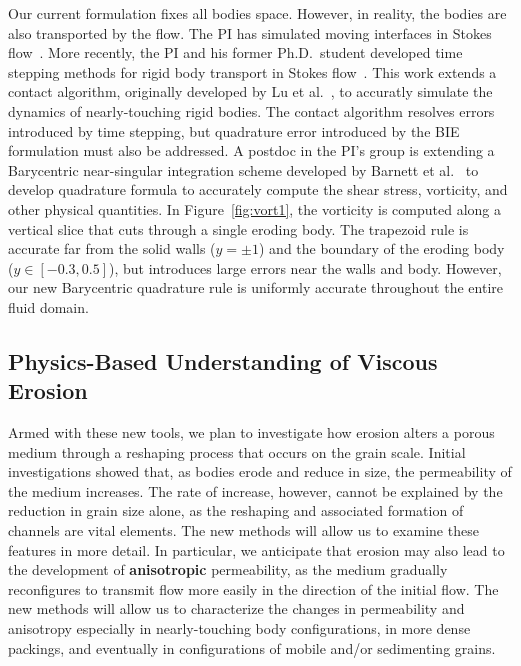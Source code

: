 \documentclass[11pt]{article}
\begin{document}
Our current formulation fixes all bodies space.  However, in reality,
the bodies are also transported by the flow.  The PI has simulated
moving interfaces in Stokes flow~\cite{qua-bir2015b, qua-bir2014,
qua-bir2016}. More recently, the PI and his former Ph.D.~student
developed time stepping methods for rigid body transport in Stokes
flow~\cite{bys-sha-qua2018}.  This work extends a contact algorithm,
originally developed by Lu et al.~\cite{lu-rah-zor2017}, to accuratly
simulate the dynamics of nearly-touching rigid bodies.  The contact
algorithm resolves errors introduced by time stepping, but quadrature
error introduced by the BIE formulation must also be addressed.  A
postdoc in the PI's group is extending a Barycentric near-singular
integration scheme developed by Barnett et al.~\cite{bar-wu-vee2015} to
develop quadrature formula to accurately compute the shear stress,
vorticity, and other physical quantities.  In Figure~\ref{fig:vort1},
the vorticity is computed along a vertical slice that cuts through a
single eroding body.  The trapezoid rule is accurate far from the solid
walls ($y = \pm 1$) and the boundary of the eroding body ($y \in
[-0.3,0.5]$), but introduces large errors near the walls and body.
However, our new Barycentric quadrature rule is uniformly accurate
throughout the entire fluid domain.


\subsection{Physics-Based Understanding of Viscous Erosion}

Armed with these new tools, we plan to investigate how erosion alters a porous medium through a reshaping process that occurs on the grain scale. Initial investigations showed that, as bodies erode and reduce in size, the permeability of the medium increases. The rate of increase, however, cannot be explained by the reduction in grain size alone, as the reshaping and associated formation of channels are vital elements. The new methods will allow us to examine these features in more detail. In particular, we anticipate that erosion may also lead to the development of {\bf anisotropic} permeability, as the medium gradually reconfigures to transmit flow more easily in the direction of the initial flow. The new methods will allow us to characterize the changes in permeability and anisotropy especially in nearly-touching body configurations, in more dense packings, and eventually in configurations of mobile and/or sedimenting grains. 
\end{document}
